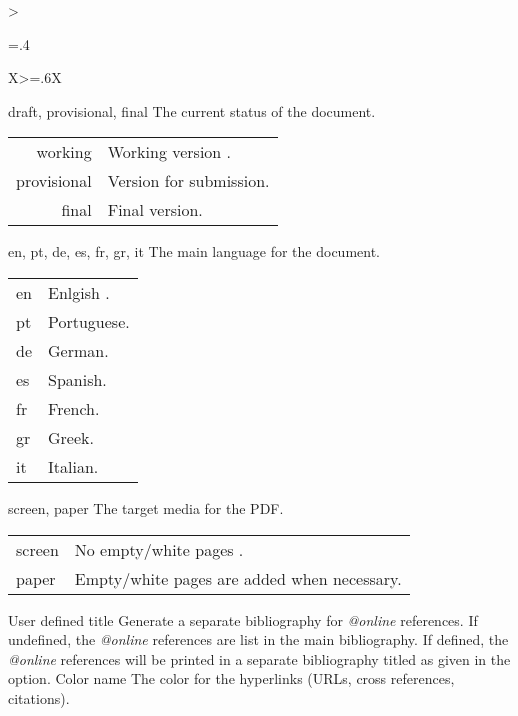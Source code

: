 \begin{xltabular}{\linewidth}{>{\hsize=.4\hsize\raggedright\arraybackslash}X>{\hsize=.6\hsize}X}
    \midrule
    {draft, provisional, final}%
    {The current status of the document.}%
	{%
    \begin{tabular}{@{}r@{ $\rightarrow$ }X@{}}
         working      & Working version .\\
         provisional  & Version for submission.\\
         final        & Final version.\\
    \end{tabular}
    }
    \midrule
    {en, pt, de, es, fr, gr, it}%
    {The main language for the document.}%
	{%
    \begin{tabular}{@{}l@{ $\rightarrow$ }X@{}}
         en & Enlgish .\\
         pt & Portuguese.\\
         de & German.\\
         es & Spanish.\\
         fr & French.\\
         gr & Greek.\\
         it & Italian.\\
    \end{tabular}
    }
    \midrule
    {screen, paper}%
    {The target media for the PDF.}%
	{%
    \begin{tabular}{@{}l@{ $\rightarrow$ }X@{}}
         screen & No empty/white pages .\\
         paper  & Empty/white pages are added when necessary.\\
    \end{tabular}
    }
    \midrule
    {User defined title}%
    {Generate a separate bibliography for \emph{@online} references.}%
	{%
		If undefined, the \emph{@online} references are list in the main bibliography.  If defined, the \emph{@online} references will be printed in a separate bibliography titled as given in the option.
    }
    \midrule
    {Color name}%
    {The color for the hyperlinks (URLs, cross references, citations).}%

\end{xltabular}
